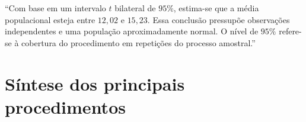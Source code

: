 \documentclass[
  letterpaper,
  DIV=11,
  numbers=noendperiod]{scrreprt}
\begin{document}
\begin{tcolorbox}[enhanced jigsaw, colback=white, leftrule=.75mm, colbacktitle=quarto-callout-tip-color!10!white, breakable, titlerule=0mm, bottomtitle=1mm, title=\textcolor{quarto-callout-tip-color}{\faLightbulb}\hspace{0.5em}{Modelo de redação}, colframe=quarto-callout-tip-color-frame, toprule=.15mm, opacityback=0, bottomrule=.15mm, opacitybacktitle=0.6, arc=.35mm, toptitle=1mm, rightrule=.15mm, coltitle=black, left=2mm]

``Com base em um intervalo \(t\) bilateral de \(95\%\), estima-se que a
média populacional esteja entre \(12{,}02\) e \(15{,}23\). Essa
conclusão pressupõe observações independentes e uma população
aproximadamente normal. O nível de \(95\%\) refere-se à cobertura do
procedimento em repetições do processo amostral.''

\end{tcolorbox}

\section{Síntese dos principais
procedimentos}\label{suxedntese-dos-principais-procedimentos}
\end{document}
